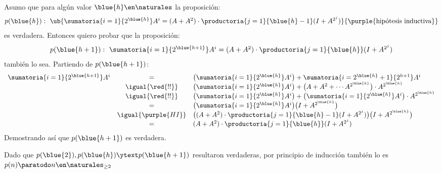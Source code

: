 {Asumo que para algún valor $\blue{h} \en \naturales$ la proposición:
$$
  \textstyle
  p(\blue{h}) : ~
  \ub{
    \sumatoria{i = 1}{2^{\blue{h}}} A^i = (A + A^2) \cdot \productoria{j = 1}{\blue{h}-1}(I + A^{2^j})
  }{
    \text{\purple{hipótesis inductiva}}
  }
$$
es verdadera. Entonces quiero probar que la proposición:
$$
  \textstyle
  p(\blue{h+1}) : ~ \sumatoria{i = 1}{2^{\blue{h+1}}} A^i = (A + A^2) \cdot \productoria{j = 1}{\blue{h}}(I + A^{2^j})
$$
también lo sea.
Partiendo de $p(\blue{h+1})$:
$$
  \begin{array}{rcl}
    \sumatoria{i = 1}{2^{\blue{h+1}}} A^i
     & =                   &
    \big(
    \sumatoria{i = 1}{2^{\blue{h}}} A^i
    \big) +
    \sumatoria{i = 2^{\blue{h}} + 1}{2^{h + 1}} A^i                      \\
     & \igual{\red{!!}}    &
    \big(
    \sumatoria{i = 1}{2^{\blue{h}}} A^i
    \big)+
    \big(A + A^2+ \cdots A^{2^{\blue{h}}}\big) \cdot A^{2^{\blue{h}}}    \\
     & \igual{\red{!!}}    &
    \big(
    \sumatoria{i = 1}{2^{\blue{h}}} A^i
    \big) +
    \big(\sumatoria{i = 1}{2^{\blue{h}}} A^i\big) \cdot A^{2^{\blue{h}}} \\
     & =                   &
    \big(
    \sumatoria{i = 1}{2^{\blue{h}}} A^i
    \big)
    \big(
    I + A^{2^{\blue{h}}}
    \big)                                                                \\
     & \igual{\purple{HI}} &
    \big(
    (A + A^2) \cdot \productoria{j = 1}{\blue{h}-1}(I + A^{2^j})
    \big)
    \big(
    I + A^{2^{\blue{h}}}
    \big)                                                                \\
     & =                   &
    (A + A^2) \cdot \productoria{j = 1}{\blue{h}}(I + A^{2^j})
  \end{array}
$$
Demostrando así que $p(\blue{h+1})$ es verdadera.

Dado que $p(\blue{2}), p(\blue{h}) \ytext p(\blue{h+1})$ resultaron verdaderas,
por principio de inducción también lo es $p(n) \paratodo n \en \naturales_{\geq 2}$
}

\fin

